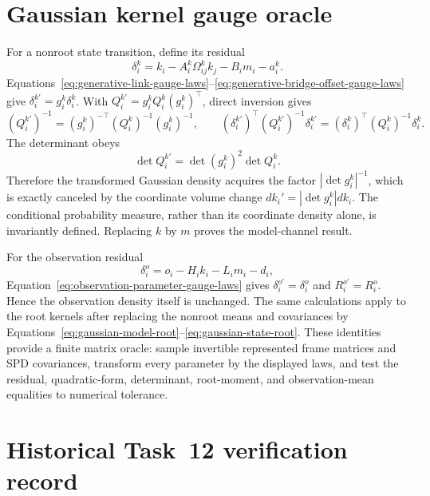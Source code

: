 \section{Gaussian kernel gauge oracle}
\label{sec:gaussian-gauge-oracle}

For a nonroot state transition, define its residual
\begin{equation}
\delta_i^k
=k_i-A_i^k\Omega_{ij}^k k_j-B_i m_i-a_i^k.
\label{eq:state-transition-residual}
\end{equation}
Equations~\eqref{eq:generative-link-gauge-laws}--\eqref{eq:generative-bridge-offset-gauge-laws} give \(\delta_i^{k\prime}=g_i^k\delta_i^k\). With \(Q_i^{k\prime}=g_i^kQ_i^k(g_i^k)^\top\), direct inversion gives
\begin{equation}
(Q_i^{k\prime})^{-1}
=(g_i^k)^{-\top}(Q_i^k)^{-1}(g_i^k)^{-1},
\qquad
(\delta_i^{k\prime})^\top(Q_i^{k\prime})^{-1}\delta_i^{k\prime}
=(\delta_i^k)^\top(Q_i^k)^{-1}\delta_i^k.
\label{eq:state-transition-quadratic-invariance}
\end{equation}
The determinant obeys
\begin{equation}
\det Q_i^{k\prime}=\det(g_i^k)^2\det Q_i^k.
\label{eq:state-transition-determinant-law}
\end{equation}
Therefore the transformed Gaussian density acquires the factor \(|\det g_i^k|^{-1}\), which is exactly canceled by the coordinate volume change \(dk_i'=|\det g_i^k|dk_i\). The conditional probability measure, rather than its coordinate density alone, is invariantly defined. Replacing \(k\) by \(m\) proves the model-channel result.

For the observation residual
\begin{equation}
\delta_i^o=o_i-H_i k_i-L_i m_i-d_i,
\label{eq:observation-residual}
\end{equation}
Equation~\eqref{eq:observation-parameter-gauge-laws} gives \(\delta_i^{o\prime}=\delta_i^o\) and \(R_i^{o\prime}=R_i^o\). Hence the observation density itself is unchanged. The same calculations apply to the root kernels after replacing the nonroot means and covariances by Equations~\eqref{eq:gaussian-model-root}--\eqref{eq:gaussian-state-root}. These identities provide a finite matrix oracle: sample invertible represented frame matrices and SPD covariances, transform every parameter by the displayed laws, and test the residual, quadratic-form, determinant, root-moment, and observation-mean equalities to numerical tolerance.


\section{Historical Task~12 verification record}
\label{sec:executable-oracle-verification-record}

